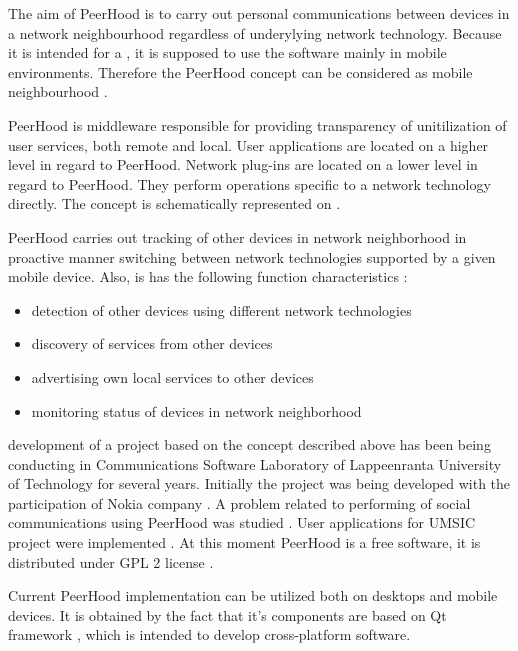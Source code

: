 %
The aim of PeerHood is to carry out personal communications between devices in a network neighbourhood regardless of underylying network technology. 
%
Because it is intended for a , it is supposed to use the software mainly in mobile environments. 
%
Therefore the PeerHood concept can be considered as mobile  neighbourhood . 

%
PeerHood is middleware responsible for providing transparency of unitilization of user services, both remote and local. 
%
User applications are located on a higher level in regard to PeerHood. 
%
Network plug-ins are located on a lower level in regard to PeerHood. 
%
They perform operations specific to a network technology directly. 
%
The concept is schematically represented on . 


%
PeerHood carries out tracking of other devices in network neighborhood in proactive manner switching between network technologies supported by a given mobile device. 
%
Also, is has the following function characteristics : 
\begin{itemize}
	\item detection of other devices using different network technologies
	\item discovery of services from other devices
	\item advertising own local services to other devices
	\item monitoring status of devices in network neighborhood
\end{itemize}

%
 development of a project based on the concept described above has been being conducting in Communications Software Laboratory of Lappeenranta University of Technology for several years. 
%
Initially the project was being developed with the participation of Nokia company . 
%
A problem related to performing of social communications using PeerHood was studied . 
%
User applications for UMSIC project  were implemented . 
%
At this moment PeerHood is a free software, it is distributed under GPL 2 license  . 

%
Current PeerHood implementation can be utilized both on desktops and mobile devices. 
%
It is obtained by the fact that it's components are based on Qt framework , which is intended to develop \A cross-platform software. 